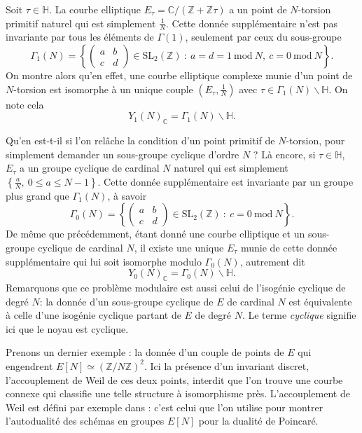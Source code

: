 \documentclass[11pt,a4paper]{article}
\newcommand{\Z}{\mathbb{Z}}
\newcommand{\C}{\mathbb{C}}
\renewcommand{\H}{\mathbb{H}}
\renewcommand{\b}{\backslash}
\renewcommand{\mod}{\ \mathrm{mod}\ }
\renewcommand{\v}{\vspace{5mm}}
\theoremstyle{definition}
\begin{document}
Soit $\tau\in \H$. La courbe elliptique $E_\tau = \C/(\Z+\Z\tau)$ a un point de $N$-torsion primitif naturel qui est simplement $\frac{1}{N}$. Cette donnée supplémentaire n'est pas invariante par tous les éléments de $\Gamma(1)$, seulement par ceux du sous-groupe
$$\Gamma_1(N) = \left\{\left(
\begin{matrix}
a & b \\
c & d
\end{matrix}
\right) \in \mathrm{SL}_2(\Z)\ :\ a = d = 1 \mod{N},\ c = 0\mod{N}\right\}.$$
On montre alors qu'en effet, une courbe elliptique complexe munie d'un point de $N$-torsion est isomorphe à un unique couple $\left(E_\tau, \frac{1}{N}\right)$ avec $\tau\in \Gamma_1(N) \b \H$. On note cela
$$Y_1(N)_\C = \Gamma_1(N) \b \H.$$

Qu'en est-t-il si l'on relâche la condition d'un point primitif de $N$-torsion, pour simplement demander un sous-groupe cyclique d'ordre $N$ ? Là encore, si $\tau\in \H$, $E_\tau$ a un groupe cyclique de cardinal $N$ naturel qui est simplement $\left\{\frac{a}{N},\ 0\leq a\leq N-1\right\}$. Cette donnée supplémentaire est invariante par un groupe plus grand que $\Gamma_1(N)$, à savoir
$$\Gamma_0(N) = \left\{\left(
\begin{matrix}
a & b \\
c & d
\end{matrix}
\right) \in \mathrm{SL}_2(\Z)\ :\ c = 0\mod{N}\right\}.$$
De même que précédemment, étant donné une courbe elliptique et un sous-groupe cyclique de cardinal $N$, il existe une unique $E_\tau$ munie de cette donnée supplémentaire qui lui soit isomorphe modulo $\Gamma_0(N)$, autrement dit
$$Y_0(N)_\C = \Gamma_0(N) \b \H.$$
Remarquons que ce problème modulaire est aussi celui de l'isogénie cyclique de degré $N$: la donnée d'un sous-groupe cyclique de $E$ de cardinal $N$ est équivalente à celle d'une isogénie cyclique partant de $E$ de degré $N$. Le terme \emph{cyclique} signifie ici que le noyau est cyclique.
\v

Prenons un dernier exemple : la donnée d'un couple de points de $E$ qui engendrent $E[N] \simeq (\Z/N\Z)^2$. Ici la présence d'un invariant discret, l'accouplement de Weil de ces deux points, interdit que l'on trouve une courbe connexe qui classifie une telle structure à isomorphisme près. L'accouplement de Weil est défini par exemple dans \cite{Sil1}: c'est celui que l'on utilise pour montrer l'autodualité des schémas en groupes $E[N]$ pour la dualité de Poincaré.
\end{document}
